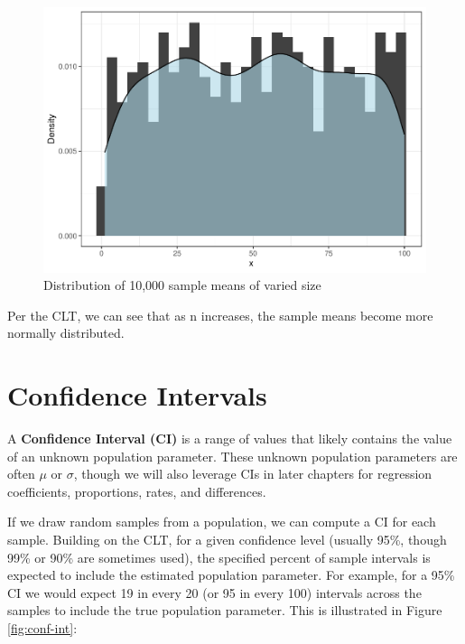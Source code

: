 \documentclass[
]{book}
\begin{document}
\begin{figure}

{\centering \includegraphics{The_Fundamentals_of_People_Analytics_files/figure-latex/unnamed-chunk-127-1} 

}

\caption{Distribution of 10,000 sample means of varied size}\label{fig:unnamed-chunk-127}
\end{figure}

Per the CLT, we can see that as n increases, the sample means become more normally distributed.

\hypertarget{confidence-intervals}{%
\section{Confidence Intervals}\label{confidence-intervals}}

A \textbf{Confidence Interval (CI)} is a range of values that likely contains the value of an unknown population parameter. These unknown population parameters are often \(\mu\) or \(\sigma\), though we will also leverage CIs in later chapters for regression coefficients, proportions, rates, and differences.

If we draw random samples from a population, we can compute a CI for each sample. Building on the CLT, for a given confidence level (usually 95\%, though 99\% or 90\% are sometimes used), the specified percent of sample intervals is expected to include the estimated population parameter. For example, for a 95\% CI we would expect 19 in every 20 (or 95 in every 100) intervals across the samples to include the true population parameter. This is illustrated in Figure \ref{fig:conf-int}:
\end{document}
